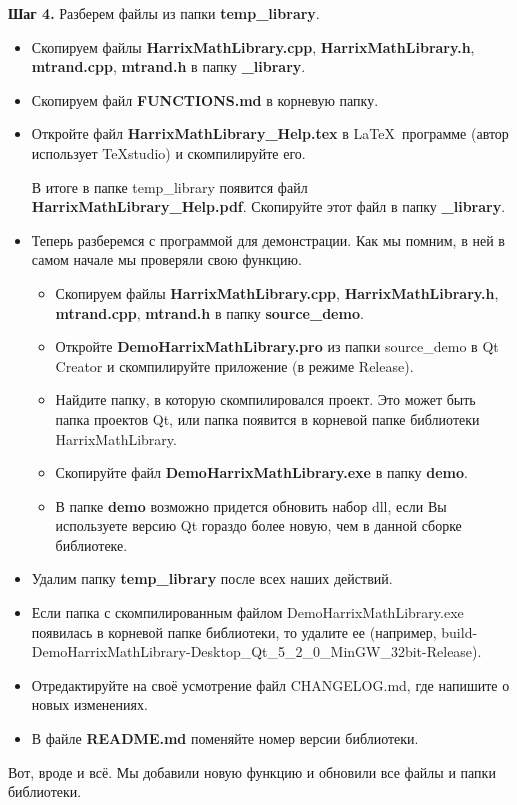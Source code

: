\textbf{Шаг 4.}\label{step4} Разберем файлы из папки \textbf{temp\_library}.

\begin{itemize}
\item Скопируем файлы \textbf{HarrixMathLibrary.cpp}, \textbf{HarrixMathLibrary.h}, \textbf{mtrand.cpp}, \textbf{mtrand.h} в папку \textbf{\_library}.

\item Скопируем файл \textbf{FUNCTIONS.md} в корневую папку.

\item Откройте файл \textbf{HarrixMathLibrary\_Help.tex } в \LaTeX \ программе (автор использует TeXstudio) и скомпилируйте его.

В итоге в папке temp\_library появится файл \textbf{HarrixMathLibrary\_Help.pdf}. Скопируйте этот файл в папку \textbf{\_library}.

\item Теперь разберемся с программой для демонстрации. Как мы помним, в ней в самом начале мы проверяли свою функцию. 
\begin{itemize}
\item Скопируем файлы \textbf{HarrixMathLibrary.cpp}, \textbf{HarrixMathLibrary.h}, \textbf{mtrand.cpp}, \textbf{mtrand.h} в папку \textbf{source\_demo}.
\item  Откройте \textbf{DemoHarrixMathLibrary.pro} из папки source\_demo в Qt Creator и скомпилируйте приложение (в режиме Release).
\item Найдите папку, в которую скомпилировался проект. Это может быть папка проектов Qt, или папка появится в корневой папке библиотеки HarrixMathLibrary.
\item Скопируйте файл \textbf{DemoHarrixMathLibrary.exe} в папку \textbf{demo}.
\item В папке \textbf{demo} возможно придется обновить набор dll, если Вы используете версию Qt гораздо более новую, чем в данной сборке библиотеке.
\end{itemize}
\item Удалим папку \textbf{temp\_library} после всех наших действий.
\item  Если папка с скомпилированным файлом DemoHarrixMathLibrary.exe появилась в корневой папке библиотеки, то удалите ее (например, build-DemoHarrixMathLibrary-Desktop\_Qt\_5\_2\_0\_MinGW\_32bit-Release).
\item Отредактируйте на своё усмотрение файл CHANGELOG.md, где напишите о новых изменениях.
\item В файле \textbf{README.md} поменяйте номер версии библиотеки.
\end{itemize}

Вот, вроде и всё. Мы добавили новую функцию и обновили все файлы и папки библиотеки.